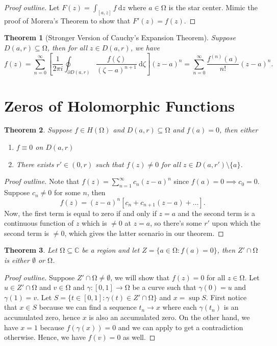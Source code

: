 \documentclass[letterpaper,12pt]{article}
\theoremstyle{definition}
\theoremstyle{plain}
\newtheorem{thm}{Theorem}[section]
\theoremstyle{remark}
\newcommand{\C}{\mathbb{C}}
\let\oldOmega\Omega
\renewcommand{\Omega}{\mathrm{\oldOmega}}
\begin{document}
\begin{proof}[Proof outline]
Let $F(z) = \int_{[a,z]}f\ \mathrm{d}z$ where $a\in\Omega$ is the star center. Mimic the proof of Morera's Theorem to show that $F'(z)=f(z)$.
\end{proof}

\begin{thm}[Stronger Version of Cauchy's Expansion Theorem]
Suppose $D(a,r)\subseteq \Omega$, then for all $z\in D(a,r)$, we have
\[f(z) = \sum_{n=0}^\infty \left[\frac{1}{2\pi i}\oint_{\partial D(a,r)} \frac{f(\zeta)}{(\zeta-a)^{n+1}}\ \mathrm{d}\zeta\right](z-a)^n = \sum_{n=0}^\infty \frac{f^{(n)}(a)}{n!}(z-a)^n.\]
\end{thm}

\section{Zeros of Holomorphic Functions}
\begin{thm}\label{thm:ZeroDisc}
Suppose $f\in H(\Omega)$ and $D(a,r)\subseteq \Omega$ and $f(a) = 0$, then either
\begin{enumerate}
	\item $f\equiv 0$ on $D(a,r)$
	\item There exists $r'\in(0,r)$ such that $f(z)\ne 0$ for all $z\in D(a,r')\setminus\{a\}$.
\end{enumerate}
\end{thm}

\begin{proof}[Proof outline]
Note that $f(z) = \sum_{n=1}^\infty c_n(z-a)^n$ since $f(a)=0\implies c_0=0$. Suppose $c_n\ne 0$ for some $n$, then
\[f(z) = (z-a)^n [c_n+c_{n+1}(z-a)+\ldots].\]
Now, the first term is equal to zero if and only if $z=a$ and the second term is a continuous function of $z$ which is $\ne 0$ at $z=a$, so there's some $r'$ upon which the second term is $\ne 0$, which gives the latter scenario in our theorem.
\end{proof}

\begin{thm}\label{thm:ZeroAccumulate}
Let $\Omega\subseteq \C$ be a region and let $Z = \{a\in \Omega:f(a) = 0\}$, then $Z'\cap \Omega$ is either $\emptyset$ or $\Omega$.
\end{thm}

\begin{proof}[Proof outline]
Suppose $Z'\cap \Omega\ne\emptyset$, we will show that $f(z) = 0$ for all $z\in\Omega$. Let $u\in Z'\cap \Omega$ and $v\in \Omega$ and $\gamma:[0,1]\to\Omega$ be a curve such that $\gamma(0)=u$ and $\gamma(1)=v$. Let $S = \{t\in[0,1]:\gamma(t)\in Z'\cap \Omega\}$ and $x=\sup S$. First notice that $x\in S$ because we can find a sequence $t_n\to x$ where each $\gamma(t_n)$ is an accumulated zero, hence $x$ is also an accumulated zero. On the other hand, we have $x=1$ because $f(\gamma(x)) = 0$ and we can apply  to get a contradiction otherwise. Hence, we have $f(v)=0$ as well.
\end{proof}
\end{document}
